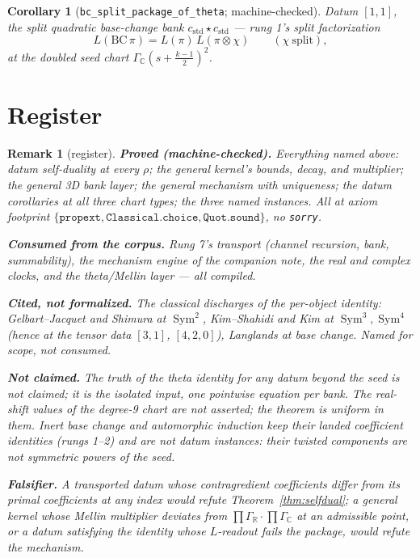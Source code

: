 \documentclass[11pt]{article}
\newtheorem{corollary}[theorem]{Corollary}
\newtheorem{remark}[theorem]{Remark}
\newcommand{\Sym}{\operatorname{Sym}}
\newcommand{\Gm}{\Gamma_{\mathbb C}}
\newcommand{\Gr}{\Gamma_{\mathbb R}}
\begin{document}
\begin{corollary}[\texttt{bc\_split\_package\_of\_theta}; machine-checked]
Datum $[1,1]$, the split quadratic base-change bank
$c_{\mathrm{std}}\star c_{\mathrm{std}}$ --- rung 1's split factorization
\[
L(\mathrm{BC}\,\pi)=L(\pi)\,L(\pi\otimes\chi)\qquad(\chi\ \text{split}),
\]
at the doubled seed chart $\Gm(s+\tfrac{k-1}2)^2$.
\end{corollary}

\section{Register}

\begin{remark}[register]
\textbf{Proved (machine-checked).}  Everything named above: datum self-duality at
every $\rho$; the general kernel's bounds, decay, and multiplier; the general 3D bank
layer; the general mechanism with uniqueness; the datum corollaries at all three chart
types; the three named instances.  All at axiom footprint
$\{\texttt{propext},\texttt{Classical.choice},\texttt{Quot.sound}\}$, no
\texttt{sorry}.

\textbf{Consumed from the corpus.}  Rung 7's transport (channel recursion, bank,
summability), the mechanism engine of the companion note, the real and complex clocks,
and the theta/Mellin layer --- all compiled.

\textbf{Cited, not formalized.}  The classical discharges of the per-object identity:
Gelbart--Jacquet \cite{GJ} and Shimura \cite{Shimura} at $\Sym^2$, Kim--Shahidi
\cite{KimShahidi} and Kim \cite{Kim} at $\Sym^3,\Sym^4$ (hence at the tensor data
$[3,1]$, $[4,2,0]$), Langlands \cite{Langlands} at base change.  Named for scope, not
consumed.

\textbf{Not claimed.}  The truth of the theta identity for any datum beyond the seed
is not claimed; it is the isolated input, one pointwise equation per bank.  The
real-shift values of the degree-9 chart are not asserted; the theorem is uniform in
them.  Inert base change and automorphic induction keep their landed coefficient
identities (rungs 1--2) and are not datum instances: their twisted components are not
symmetric powers of the seed.

\textbf{Falsifier.}  A transported datum whose contragredient coefficients differ from
its primal coefficients at any index would refute Theorem~\ref{thm:selfdual}; a
general kernel whose Mellin multiplier deviates from $\prod\Gr\cdot\prod\Gm$ at an
admissible point, or a datum satisfying the identity whose $L$-readout fails the
package, would refute the mechanism.
\end{remark}
\end{document}
